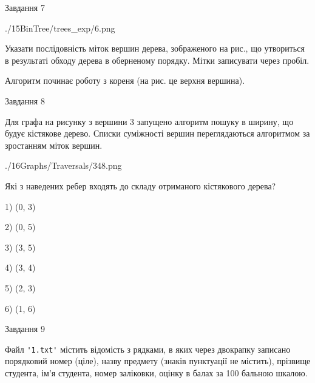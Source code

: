 \documentclass[12pt, ukrainian]{article}
\def\code#1{\Verb!#1!}
\begin{document}
{\vspace{10mm}\par

\newpage
\begin{minipage}[t]{9.7cm}
               
{\begin{center}Завдання {7}\end{center}}
\vspace{-6mm}

\begin{center}
	{./15BinTree/trees_exp/6.png}
\end{center}
Указати послідовність міток вершин дерева, зображеного на рис., що утвориться в результаті обходу дерева в оберненому порядку. Мітки записувати через пробіл.\par Алгоритм починає роботу з кореня (на рис. це верхня вершина).\par

\end{minipage}
\vline \hspace{8mm}
\begin{minipage}[t]{8.0cm}
               
{\begin{center}Завдання {8}\end{center}}
\vspace{-6mm}
Для графа на рисунку з вершини 3 запущено алгоритм пошуку в ширину, що будує кістякове дерево. Списки суміжності вершин переглядаються алгоритмом за зростанням міток вершин.\par
\begin{center}
	{./16Graphs/Traversals/348.png}
\end{center}
\par Які з наведених ребер входять до складу отриманого кістякового дерева?\par
1) (0, 3)\par
2) (0, 5)\par
3) (3, 5)\par
4) (3, 4)\par
5) (2, 3)\par
6) (1, 6)\par
{\vskip 15pt} \par

\end{minipage}

               
{\begin{center}Завдання {9}\end{center}}
\vspace{-6mm}
Файл \code{'1.txt'} містить відомість з рядками, в яких через двокрапку записано поряд\-ковий номер (ціле), назву предмету (знаків пунктуації не містить), прізвище студента, ім'я студента, номер заліковки, оцінку в балах за 100 бальною шкалою.

}
\end{document}
